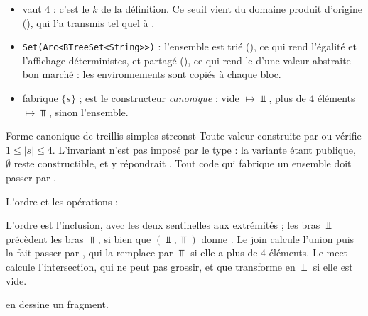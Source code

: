 \begin{itemize}
  \item {} vaut 4 : c'est le $k$ de la définition.
    Ce seuil vient du domaine produit d'origine (), qui l'a transmis
    tel quel à .
  \item \texttt{Set(Arc<BTreeSet<String>{}>)} : l'ensemble est trié
    (), ce qui rend l'égalité et l'affichage déterministes, et
    partagé (), ce qui rend le  d'une valeur abstraite
    bon marché : les environnements sont copiés à chaque bloc.
  \item {} fabrique $\{s\}$ ;  est le
    constructeur \emph{canonique} : vide $\mapsto \Bot$, plus de 4 éléments
    $\mapsto \Top$, sinon l'ensemble.
\end{itemize}

\begin{invariant}{Forme canonique de }{treillis-simples-strconst}
  Toute valeur  construite par  ou
   vérifie $1 \le |s| \le 4$. L'invariant n'est pas imposé par
  le type : la variante étant publique, $\emptyset$\code{))}
  reste constructible, et  y répondrait . Tout
  code qui fabrique un ensemble doit passer par .
\end{invariant}

L'ordre et les opérations :



L'ordre est l'inclusion, avec les deux sentinelles aux extrémités ; les bras
$\Bot$ précèdent les bras $\Top$, si bien que $(\Bot, \Top)$ donne
. Le join calcule l'union puis la fait passer par ,
qui la remplace par $\Top$ si elle a plus de 4 éléments. Le meet calcule
l'intersection, qui ne peut pas grossir, et que  transforme en
$\Bot$ si elle est vide.

 en dessine un fragment.

